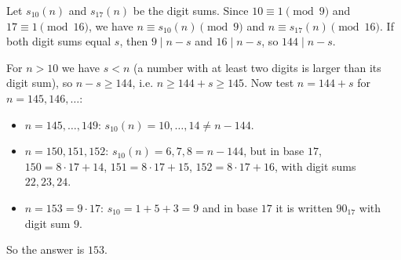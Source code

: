 Let $s_{10}(n)$ and $s_{17}(n)$ be the digit sums. Since $10\equiv1\pmod9$ and $17\equiv1\pmod{16}$, we have $n\equiv s_{10}(n)\pmod9$ and $n\equiv s_{17}(n)\pmod{16}$. If both digit sums equal $s$, then $9\mid n-s$ and $16\mid n-s$, so $144\mid n-s$.

For $n>10$ we have $s<n$ (a number with at least two digits is larger than its digit sum), so $n-s\ge144$, i.e. $n\ge144+s\ge145$. Now test $n=144+s$ for $n=145,146,\dots$:
\begin{itemize}
\item $n=145,\dots,149$: $s_{10}(n)=10,\dots,14\ne n-144$.
\item $n=150,151,152$: $s_{10}(n)=6,7,8=n-144$, but in base $17$, $150=8\cdot17+14$, $151=8\cdot17+15$, $152=8\cdot17+16$, with digit sums $22,23,24$.
\item $n=153=9\cdot17$: $s_{10}=1+5+3=9$ and in base $17$ it is written $90_{17}$ with digit sum $9$.
\end{itemize}
So the answer is $\boxed{153}$.
